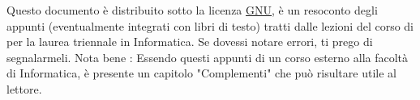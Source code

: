 \documentclass[10pt, letterpaper]{report}
\begin{document}
\newpage
\pagecolor{cartaRiciclata}%
\Large
Questo documento è distribuito sotto la licenza 
\color{blue}\href{https://www.gnu.org/licenses/fdl-1.3.txt}{GNU}\color{black},  
è un resoconto degli appunti (eventualmente integrati con libri di testo) tratti dalle lezioni del corso di \jobname
\hphantom{a}per la laurea 
triennale in Informatica. Se dovessi notare errori, ti prego di segnalarmeli.\acc 
Nota bene : Essendo questi appunti di un corso esterno alla facoltà di Informatica, 
è presente un capitolo "Complementi" che può risultare utile al lettore.
\newpage %
\normalsize
\tableofcontents 
\newpage

\fancyhf{}
\fancyhead[L]{\nouppercase{\leftmark}}
\fancyfoot[C]{\thepage}


\end{document}
